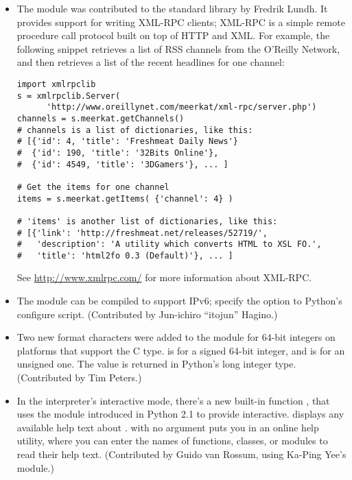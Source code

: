 \documentclass{howto}
\begin{document}
\begin{itemize}

  \item The  module was contributed to the standard
  library by Fredrik Lundh.  It provides support for writing XML-RPC
  clients; XML-RPC is a simple remote procedure call protocol built on
  top of HTTP and XML. For example, the following snippet retrieves a
  list of RSS channels from the O'Reilly Network, and then retrieves a
  list of the recent headlines for one channel:

\begin{verbatim}
import xmlrpclib
s = xmlrpclib.Server(
      'http://www.oreillynet.com/meerkat/xml-rpc/server.php')
channels = s.meerkat.getChannels()
# channels is a list of dictionaries, like this:
# [{'id': 4, 'title': 'Freshmeat Daily News'}
#  {'id': 190, 'title': '32Bits Online'},
#  {'id': 4549, 'title': '3DGamers'}, ... ]

# Get the items for one channel
items = s.meerkat.getItems( {'channel': 4} )

# 'items' is another list of dictionaries, like this:
# [{'link': 'http://freshmeat.net/releases/52719/', 
#   'description': 'A utility which converts HTML to XSL FO.', 
#   'title': 'html2fo 0.3 (Default)'}, ... ]
\end{verbatim}

See \url{http://www.xmlrpc.com/} for more information about XML-RPC.

  \item The  module can be compiled to support IPv6;
  specify the  option to Python's configure
  script.  (Contributed by Jun-ichiro ``itojun'' Hagino.)

  \item Two new format characters were added to the 
  module for 64-bit integers on platforms that support the C
   type.   is for a signed 64-bit integer,
  and  is for an unsigned one.  The value is returned in
  Python's long integer type.  (Contributed by Tim Peters.)

  \item In the interpreter's interactive mode, there's a new built-in
  function , that uses the  module
  introduced in Python 2.1 to provide interactive.
   displays any available help text about
  .   with no argument puts you in an online
  help utility, where you can enter the names of functions, classes,
  or modules to read their help text.
  (Contributed by Guido van Rossum, using Ka-Ping Yee's  module.)


\end{itemize}
\end{document}

